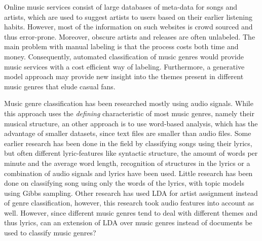
Online music services consist of large databases of meta-data for songs and artists, which are used to suggest artists to users based on their earlier listening habits. However, most of the information on such websites is crowd sourced and thus error-prone. Moreover, obscure artists and releases are often unlabeled. The main problem with manual labeling is that the process costs both time and money.  Consequently, automated classification of music genres would provide music services with a cost efficient way of labeling. Furthermore, a generative model approach may provide new insight into the themes present in different music genres that elude casual fans.

Music genre classification has been researched mostly using audio signals\cite{audio_classification}. While this approach uses the \textit{defining} characteristic of most music genres, namely their musical structure, an other approach is to use word-based analysis, which has the advantage of smaller datasets, since text files are smaller than audio files. Some earlier research has been done in the field by classifying songs using their lyrics, but often different lyric-features like syntactic structure\cite{felllyrics}, the amount of words per minute and the average word length\cite{mayeraudiolyrics}, recognition of structures in the lyrics\cite{maxwellgenome} or a combination of audio signals and lyrics\cite{mayeraudiolyrics} have been used. Little research has been done on classifying song using only the words of the lyrics\cite{stateoftheart}, with topic models using Gibbs sampling. Other research has used LDA for artist assignment instead of genre classification\cite{liartists}, however, this research took audio features into account as well. However, since different music genres tend to deal with different themes and thus lyrics, can an extension of LDA over music genres instead of documents be used to classify music genres?

